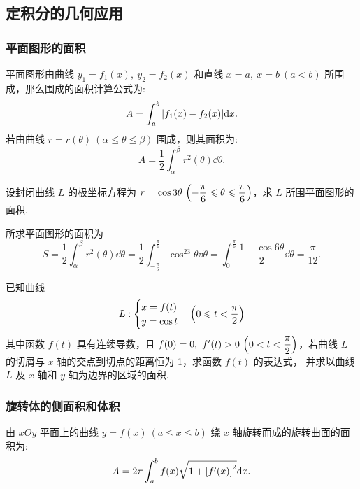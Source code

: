 \subsection{定积分的几何应用}

\subsubsection{平面图形的面积}

\begin{theorem}[平面图形面积公式]
    平面图形由曲线 $y_1=f_1(x),~y_2=f_2(x)$ 和直线 $x=a,~x=b~ (a<b)$ 所围成，那么围成的面积计算公式为:
    $$A=\int_{a}^{b}\qty|f_1(x)-f_2(x)|\dd x.$$
    若由曲线 $r=r(\theta)~ (\alpha\leqslant \theta\leqslant \beta)$ 围成，则其面积为:
    $$A=\dfrac{1}{2}\int_{\alpha}^{\beta}r^2(\theta)\dd \theta.$$
\end{theorem}

\begin{example}
    设封闭曲线 $L$ 的极坐标方程为 $r=\cos3\theta~ \qty(-\dfrac{\pi}{6}\leqslant \theta\leqslant\dfrac{\pi}{6})$，求 $L$ 所围平面图形的面积.
\end{example}
\begin{solution}
    所求平面图形的面积为
    $$S=\dfrac{1}{2}\int_{\alpha}^{\beta}r^2(\theta)\dd \theta=\dfrac{1}{2}\int_{-\frac{\pi}{6}}^{\frac{\pi}{6}}\cos^23\theta\dd \theta=\int_{0}^{\frac{\pi}{6}}\dfrac{1+\cos6\theta}{2}\dd \theta=\dfrac{\pi}{12}.$$
\end{solution}

\begin{example}[2012 数一]
    已知曲线 $$L:\begin{cases}
            x=f(t) \\y=\cos t
        \end{cases}\qty(0\leqslant t<\dfrac{\pi}{2})$$
    其中函数 $f(t)$ 具有连续导数，且 $f(0)=0,~f'(t)>0~ \qty(0<t<\dfrac{\pi}{2})$，若曲线 $L$ 的切屑与 $x$ 轴的交点到切点的距离恒为 1，求函数 $f(t)$ 的表达式，
    并求以曲线 $L$ 及 $x$ 轴和 $y$ 轴为边界的区域的面积.
\end{example}

\subsubsection{旋转体的侧面积和体积}

\begin{theorem}[旋转体的侧面积公式]
    由 $xOy$ 平面上的曲线 $y=f(x)~ (a\leqslant x\leqslant b)$ 绕 $x$ 轴旋转而成的旋转曲面的面积为:
    $$A=2\pi\int_{a}^{b}f(x)\sqrt{1+\qty[f'(x)]^2 }\dd x.$$
\end{theorem}

